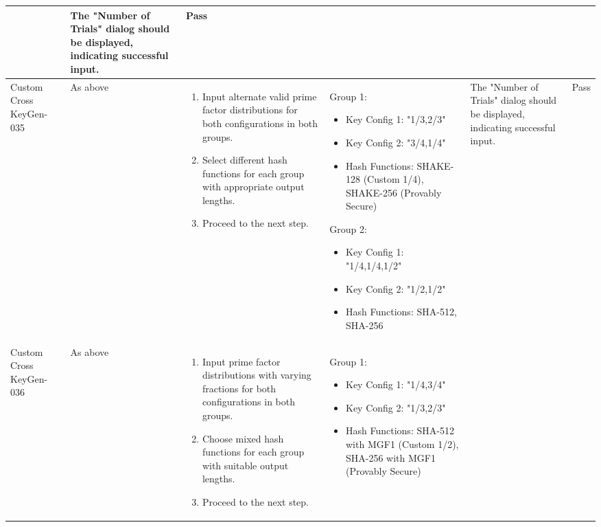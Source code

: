 \documentclass[]{final_report}
\theoremstyle{definition}
\begin{document}
\begin{longtable}{|p{1.5cm}|p{2.5cm}|p{3.5cm}|p{3.0cm}|p{3cm}|p{2cm}|}
  
  & The "Number of Trials" dialog should be displayed, indicating successful input. & Pass \\
  \hline
  Custom
  Cross
  KeyGen-035 & As above & 
  \begin{enumerate}
    \item Input alternate valid prime factor distributions for both configurations in both groups.
    \item Select different hash functions for each group with appropriate output lengths.
    \item Proceed to the next step.
  \end{enumerate} & 
  Group 1:
\begin{itemize}
  \item Key Config 1: "1/3,2/3"
  \item Key Config 2: "3/4,1/4"
  \item Hash Functions: SHAKE-128 (Custom 1/4), SHAKE-256 (Provably Secure)
\end{itemize}

Group 2:
\begin{itemize}
  \item Key Config 1: "1/4,1/4,1/2"
  \item Key Config 2: "1/2,1/2"
  \item Hash Functions: SHA-512, SHA-256
\end{itemize}

  & The "Number of Trials" dialog should be displayed, indicating successful input. & Pass \\
  \hline
  Custom
  Cross
  KeyGen-036 & As above & 
  \begin{enumerate}
    \item Input prime factor distributions with varying fractions for both configurations in both groups.
    \item Choose mixed hash functions for each group with suitable output lengths.
    \item Proceed to the next step.
  \end{enumerate} & Group 1:
\begin{itemize}
  \item Key Config 1: "1/4,3/4"
  \item Key Config 2: "1/3,2/3"
  \item Hash Functions: SHA-512 with MGF1 (Custom 1/2), SHA-256 with MGF1 (Provably Secure)
\end{itemize}


\end{longtable}
\end{document}
